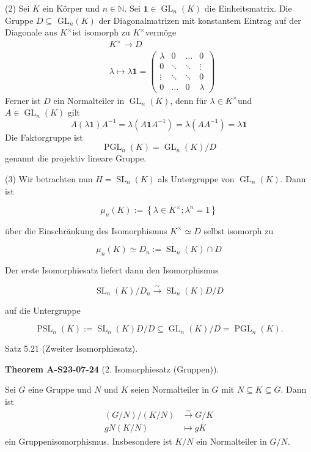 \documentclass[10pt, letterpaper]{article}
\newcommand{\CustomHeading}[3]{%
  \par\medskip\noindent%
  \textbf{#1 #2} \textnormal{(#3)}.\enskip%
}
\newenvironment{THEO}[2]{\begin{unitbox}\CustomHeading{Theorem}{#1}{#2}}{\end{unitbox}}
\begin{document}
(2) Sei $K$ ein Körper und $n \in \mathbb{N}$. Sei $\mathbf{1} \in \operatorname{GL}_{n}(K)$ die Einheitsmatrix. Die Gruppe $D \subseteq$ $\mathrm{GL}_{n}(K)$ der Diagonalmatrizen mit konstantem Eintrag auf der Diagonale aus $K^{\times}$ist isomorph zu $K^{\times}$vermöge
$$
\begin{aligned}
& K^{\times} \rightarrow D \\
& \lambda \mapsto \lambda \mathbf{1}=\left(\begin{array}{cccc}
\lambda & 0 & \ldots & 0 \\
0 & \ddots & \ddots & \vdots \\
\vdots & \ddots & \ddots & 0 \\
0 & \ldots & 0 & \lambda
\end{array}\right)
\end{aligned}
$$
Ferner ist $D$ ein Normalteiler in $\operatorname{GL}_{n}(K)$, denn für $\lambda \in K^{\times}$und $A \in \operatorname{GL}_{n}(K)$ gilt
$$
A(\lambda \mathbf{1}) A^{-1}=\lambda\left(A \mathbf{1} A^{-1}\right)=\lambda\left(A A^{-1}\right)=\lambda \mathbf{1}
$$
Die Faktorgruppe ist
$$
\operatorname{PGL}_{n}(K)=\operatorname{GL}_{n}(K) / D
$$
genannt die projektiv lineare Gruppe.


(3) Wir betrachten nun $H=\operatorname{SL}_{n}(K)$ als Untergruppe von $\operatorname{GL}_{n}(K)$. Dann ist

$$
\mu_{n}(K):=\left\{\lambda \in K^{\times} ; \lambda^{n}=1\right\}
$$

über die Einschränkung des Isomorphismus $K^{\times} \simeq D$ selbst isomorph zu

$$
\mu_{n}(K) \simeq D_{n}:=\operatorname{SL}_{n}(K) \cap D
$$

Der erste Isomorphiesatz liefert dann den Isomorphismus

$$
\operatorname{SL}_{n}(K) / D_{n} \xrightarrow{\sim} \operatorname{SL}_{n}(K) D / D
$$

auf die Untergruppe

$$
\operatorname{PSL}_{n}(K):=\operatorname{SL}_{n}(K) D / D \subseteq \operatorname{GL}_{n}(K) / D=\operatorname{PGL}_{n}(K) .
$$



Satz 5.21 (Zweiter Isomorphiesatz). 


\begin{THEO}{A-S23-07-24}{2. Isomorphiesatz (Gruppen)}
Sei $G$ eine Gruppe und $N$ und $K$ seien Normalteiler in $G$ mit $N \subseteq K \subseteq G$. Dann ist
$$
\begin{aligned}
(G / N) /(K / N) & \xrightarrow{\sim} G / K \\
g N(K / N) & \mapsto g K
\end{aligned}
$$
ein Gruppenisomorphismus. Insbesondere ist $K / N$ ein Normalteiler in $G / N$.
\end{THEO}
\end{document}
